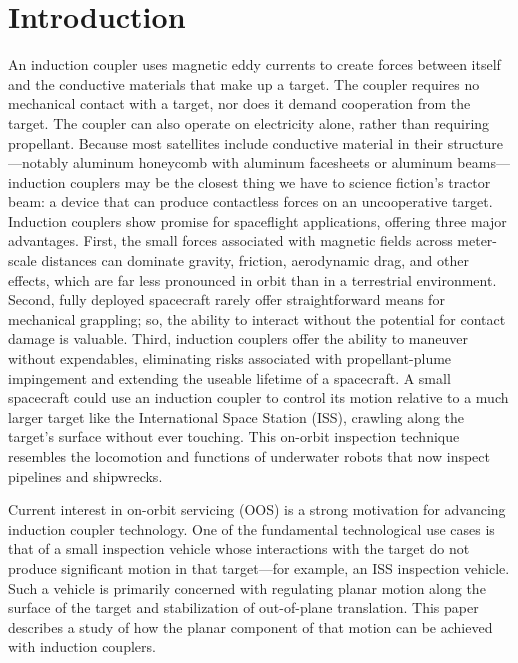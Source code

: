 \section{Introduction} 
An induction coupler uses magnetic eddy currents to create forces between itself and the conductive materials that make up a target. The coupler requires no mechanical contact with a target, nor does it demand cooperation from the target. The coupler can also operate on electricity alone, rather than requiring propellant. Because most satellites include conductive material in their structure—notably aluminum honeycomb with aluminum facesheets or aluminum beams—induction couplers may be the closest thing we have to science fiction's tractor beam: a device that can produce  contactless forces on an uncooperative target. 
Induction couplers show promise for spaceflight applications, offering three major advantages. First, the small forces associated with magnetic fields across meter-scale distances can dominate gravity, friction, aerodynamic drag, and other effects, which are far less pronounced in orbit than in a terrestrial environment. Second, fully deployed spacecraft rarely offer straightforward means for mechanical grappling; so, the ability to interact without the potential for contact damage is valuable. Third, induction couplers offer the ability to maneuver without expendables, eliminating risks associated with propellant-plume impingement and extending the useable lifetime of a spacecraft.
A small spacecraft could use an induction coupler to control its motion relative to a much larger target like the International Space Station (ISS), crawling along the target’s surface without ever touching. This on-orbit inspection technique resembles the locomotion and functions of underwater robots that now inspect pipelines and shipwrecks. 
 
Current interest in on-orbit servicing (OOS) is a strong motivation for advancing induction coupler technology. One of the fundamental technological use cases is that of a small inspection vehicle whose interactions with the target do not produce significant motion in that target—for example, an ISS inspection vehicle. Such a vehicle is primarily concerned with regulating planar motion along the surface of the target and stabilization of out-of-plane translation. This paper  describes a study of how the planar component of that motion can be achieved with induction couplers. 
